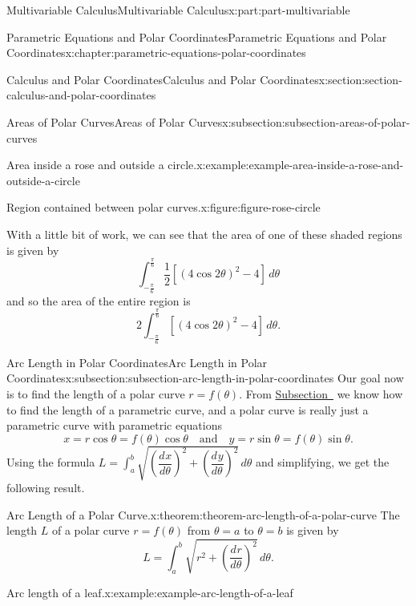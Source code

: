 \documentclass[twoside,10pt,]{tufte-book}
\numberwithin{equation}{part}
\newcommand{\dv}[3][]{\dfrac{d^{#1} #2}{d #3^{#1}}}
\begin{document}
\begin{partptx}{Multivariable Calculus}{}{Multivariable Calculus}{}{}{x:part:part-multivariable}
\begin{chapterptx}{Parametric Equations and Polar Coordinates}{}{Parametric Equations and Polar Coordinates}{}{}{x:chapter:parametric-equations-polar-coordinates}
\begin{sectionptx}{Calculus and Polar Coordinates}{}{Calculus and Polar Coordinates}{}{}{x:section:section-calculus-and-polar-coordinates}
\begin{subsectionptx}{Areas of Polar Curves}{}{Areas of Polar Curves}{}{}{x:subsection:subsection-areas-of-polar-curves}
\begin{example}{Area inside a rose and outside a circle.}{x:example:example-area-inside-a-rose-and-outside-a-circle}
\begin{figureptx}{Region contained between polar curves.}{x:figure:figure-rose-circle}{}
\begin{image}{0}{1}{0}
{\begin{tikzpicture}[scale=.5]
\end{tikzpicture}
}%
\end{image}%
\tcblower
\end{figureptx}%
With a little bit of work, we can see that the area of one of these shaded regions is given by%
%
\begin{equation*}
\int_{-\frac{\pi}{6}}^{\frac{\pi}{6}} \frac{1}{2}[(4\cos2\theta)^{2}-4]\,d\theta
\end{equation*}
and so the area of the entire region is%
%
\begin{equation*}
2\int_{-\frac{\pi}{6}}^{\frac{\pi}{6}}[(4\cos2\theta)^{2}-4]\,d\theta.
\end{equation*}
\end{example}
\end{subsectionptx}
%
%
\typeout{************************************************}
\typeout{************************************************}
%
\begin{subsectionptx}{Arc Length in Polar Coordinates}{}{Arc Length in Polar Coordinates}{}{}{x:subsection:subsection-arc-length-in-polar-coordinates}
Our goal now is to find the length of a polar curve \(r=f(\theta)\). From \hyperref[x:subsection:subsection-arc-length-parametric-curves]{Subsection~} we know how to find the length of a parametric curve, and a polar curve is really just a parametric curve with parametric equations%
%
\begin{equation*}
x = r\cos\theta = f(\theta)\cos\theta \quad\text{and}\quad y = r\sin\theta = f(\theta)\sin\theta.
\end{equation*}
Using the formula \(L = \int_{a}^{b}\sqrt{(\dv{x}{\theta})^{2}+(\dv{y}{\theta})^{2}}\,d\theta\) and simplifying, we get the following result.%
\begin{theorem}{Arc Length of a Polar Curve.}{}{x:theorem:theorem-arc-length-of-a-polar-curve}%
%
The length \(L\) of a polar curve \(r = f(\theta)\) from \(\theta=a\) to \(\theta=b\) is given by%
\begin{equation*}
L = \int_{a}^{b}\sqrt{r^{2} + \left(\dv{r}{\theta}\right)^{2}}\,d\theta.
\end{equation*}
%
\end{theorem}
\begin{example}{Arc length of a leaf.}{x:example:example-arc-length-of-a-leaf}%

\end{example}
\end{subsectionptx}
\end{sectionptx}
\end{chapterptx}
\end{partptx}
\end{document}
